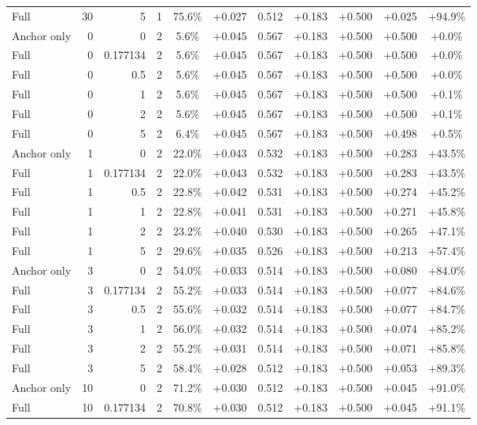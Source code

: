 \begin{table}[htbp]
\begin{tabular}{lrrrccccccc}
Full & 30 & 5 & 1 & 75.6\% & +0.027 & 0.512 & +0.183 & +0.500 & +0.025 & +94.9\% \\
Anchor only & 0 & 0 & 2 & 5.6\% & +0.045 & 0.567 & +0.183 & +0.500 & +0.500 & +0.0\% \\
Full & 0 & 0.177134 & 2 & 5.6\% & +0.045 & 0.567 & +0.183 & +0.500 & +0.500 & +0.0\% \\
Full & 0 & 0.5 & 2 & 5.6\% & +0.045 & 0.567 & +0.183 & +0.500 & +0.500 & +0.0\% \\
Full & 0 & 1 & 2 & 5.6\% & +0.045 & 0.567 & +0.183 & +0.500 & +0.500 & +0.1\% \\
Full & 0 & 2 & 2 & 5.6\% & +0.045 & 0.567 & +0.183 & +0.500 & +0.500 & +0.1\% \\
Full & 0 & 5 & 2 & 6.4\% & +0.045 & 0.567 & +0.183 & +0.500 & +0.498 & +0.5\% \\
Anchor only & 1 & 0 & 2 & 22.0\% & +0.043 & 0.532 & +0.183 & +0.500 & +0.283 & +43.5\% \\
Full & 1 & 0.177134 & 2 & 22.0\% & +0.043 & 0.532 & +0.183 & +0.500 & +0.283 & +43.5\% \\
Full & 1 & 0.5 & 2 & 22.8\% & +0.042 & 0.531 & +0.183 & +0.500 & +0.274 & +45.2\% \\
Full & 1 & 1 & 2 & 22.8\% & +0.041 & 0.531 & +0.183 & +0.500 & +0.271 & +45.8\% \\
Full & 1 & 2 & 2 & 23.2\% & +0.040 & 0.530 & +0.183 & +0.500 & +0.265 & +47.1\% \\
Full & 1 & 5 & 2 & 29.6\% & +0.035 & 0.526 & +0.183 & +0.500 & +0.213 & +57.4\% \\
Anchor only & 3 & 0 & 2 & 54.0\% & +0.033 & 0.514 & +0.183 & +0.500 & +0.080 & +84.0\% \\
Full & 3 & 0.177134 & 2 & 55.2\% & +0.033 & 0.514 & +0.183 & +0.500 & +0.077 & +84.6\% \\
Full & 3 & 0.5 & 2 & 55.6\% & +0.032 & 0.514 & +0.183 & +0.500 & +0.077 & +84.7\% \\
Full & 3 & 1 & 2 & 56.0\% & +0.032 & 0.514 & +0.183 & +0.500 & +0.074 & +85.2\% \\
Full & 3 & 2 & 2 & 55.2\% & +0.031 & 0.514 & +0.183 & +0.500 & +0.071 & +85.8\% \\
Full & 3 & 5 & 2 & 58.4\% & +0.028 & 0.512 & +0.183 & +0.500 & +0.053 & +89.3\% \\
Anchor only & 10 & 0 & 2 & 71.2\% & +0.030 & 0.512 & +0.183 & +0.500 & +0.045 & +91.0\% \\
Full & 10 & 0.177134 & 2 & 70.8\% & +0.030 & 0.512 & +0.183 & +0.500 & +0.045 & +91.1\% \\

\end{tabular}
\end{table}
